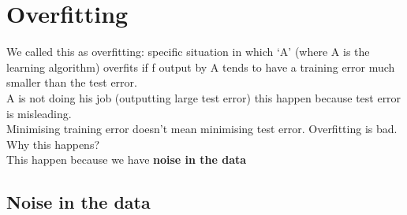 \documentclass[../main.tex]{subfiles}
\begin{document}
\section{Overfitting}
We called this as overfitting: specific situation in which ‘A’ (where A is the
learning algorithm) overfits if f output by A tends to have a training error much
smaller than the test error.\\
A is not doing his job (outputting large test error) this happen because test
error is misleading.\\
Minimising training error doesn’t mean minimising test error. Overfitting is bad.\\
Why this happens?\\
This happen because we have \textbf{noise in the data}\\

\subsection{Noise in the data}
\end{document}
